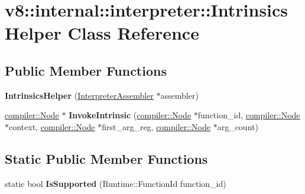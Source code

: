 \hypertarget{classv8_1_1internal_1_1interpreter_1_1_intrinsics_helper}{}\section{v8\+:\+:internal\+:\+:interpreter\+:\+:Intrinsics\+Helper Class Reference}
\label{classv8_1_1internal_1_1interpreter_1_1_intrinsics_helper}
\subsection*{Public Member Functions}
\begin{DoxyCompactItemize}
\item 
{\bfseries Intrinsics\+Helper} (\hyperlink{classv8_1_1internal_1_1interpreter_1_1_interpreter_assembler}{Interpreter\+Assembler} $\ast$assembler)\hypertarget{classv8_1_1internal_1_1interpreter_1_1_intrinsics_helper_a32749baee2bd58198ff43adfdbb3084f}{}\label{classv8_1_1internal_1_1interpreter_1_1_intrinsics_helper_a32749baee2bd58198ff43adfdbb3084f}

\item 
\hyperlink{classv8_1_1internal_1_1compiler_1_1_node}{compiler\+::\+Node} $\ast$ {\bfseries Invoke\+Intrinsic} (\hyperlink{classv8_1_1internal_1_1compiler_1_1_node}{compiler\+::\+Node} $\ast$function\+\_\+id, \hyperlink{classv8_1_1internal_1_1compiler_1_1_node}{compiler\+::\+Node} $\ast$context, \hyperlink{classv8_1_1internal_1_1compiler_1_1_node}{compiler\+::\+Node} $\ast$first\+\_\+arg\+\_\+reg, \hyperlink{classv8_1_1internal_1_1compiler_1_1_node}{compiler\+::\+Node} $\ast$arg\+\_\+count)\hypertarget{classv8_1_1internal_1_1interpreter_1_1_intrinsics_helper_a45d565d2c6fc02993b7d7bc7b1945fc4}{}\label{classv8_1_1internal_1_1interpreter_1_1_intrinsics_helper_a45d565d2c6fc02993b7d7bc7b1945fc4}

\end{DoxyCompactItemize}
\subsection*{Static Public Member Functions}
\begin{DoxyCompactItemize}
\item 
static bool {\bfseries Is\+Supported} (Runtime\+::\+Function\+Id function\+\_\+id)\hypertarget{classv8_1_1internal_1_1interpreter_1_1_intrinsics_helper_a9d10da91c4a901f5184cee8b9896792a}{}\label{classv8_1_1internal_1_1interpreter_1_1_intrinsics_helper_a9d10da91c4a901f5184cee8b9896792a}

\end{DoxyCompactItemize}
